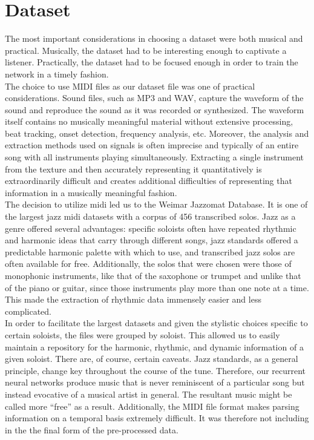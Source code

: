 \documentclass[conference]{IEEEtran}
\begin{document}
\section{Dataset}
The most important considerations in choosing a dataset were both musical and practical. Musically, the dataset had to be interesting enough to captivate a listener. Practically, the dataset had to be focused enough in order to train the network in a timely fashion.\\

The choice to use MIDI files as our dataset file was one of practical considerations. Sound files, such as MP3 and WAV, capture the waveform of the sound and reproduce the sound as it was recorded or synthesized. The waveform itself contains no musically meaningful material without extensive processing, beat tracking, onset detection, frequency analysis, etc. Moreover, the analysis and extraction methods used on signals is often imprecise and typically of an entire song with all instruments playing simultaneously. Extracting a single instrument from the texture and then accurately representing it quantitatively is extraordinarily difficult and creates additional difficulties of representing that information in a musically meaningful fashion.\\

The decision to utilize midi led us to the Weimar Jazzomat Database. It is one of the largest jazz midi datasets with a corpus of 456 transcribed solos. Jazz as a genre offered several advantages: specific soloists often have repeated rhythmic and harmonic ideas that carry through different songs, jazz standards offered a predictable harmonic palette with which to use, and transcribed jazz solos are often available for free. Additionally, the solos that were chosen were those of monophonic instruments, like that of the saxophone or trumpet and unlike that of the piano or guitar, since those instruments play more than one note at a time. This made the extraction of rhythmic data immensely easier and less complicated.\\

In order to facilitate the largest datasets and given the stylistic choices specific to certain soloists, the files were grouped by soloist. This allowed us to easily maintain a repository for the harmonic, rhythmic, and dynamic information of a given soloist. There are, of course, certain caveats. Jazz standards, as a general principle, change key throughout the course of the tune. Therefore, our recurrent neural networks produce music that is never reminiscent of a particular song but instead evocative of a musical artist in general. The resultant music might be called more “free” as a result. Additionally, the MIDI file format makes parsing information on a temporal basis extremely difficult. It was therefore not including in the the final form of the pre-processed data.\\
\end{document}
